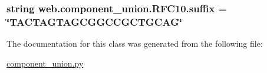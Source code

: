 \hypertarget{classweb_1_1component__union_1_1_r_f_c10_ac2650362ac0e37bbe76d7d2ca7c34d0a}{
\subsubsection[{suffix}]{\setlength{\rightskip}{0pt plus 5cm}string web.\-component\-\_\-union.\-R\-F\-C10.\-suffix = \char`\"{}T\-A\-C\-T\-A\-G\-T\-A\-G\-C\-G\-G\-C\-C\-G\-C\-T\-G\-C\-A\-G\char`\"{}\hspace{0.3cm}{\ttfamily [static]}}}\label{classweb_1_1component__union_1_1_r_f_c10_ac2650362ac0e37bbe76d7d2ca7c34d0a}


The documentation for this class was generated from the following file\-:\begin{DoxyCompactItemize}
\item 
\hyperlink{component__union_8py}{component\-\_\-union.\-py}\end{DoxyCompactItemize}
